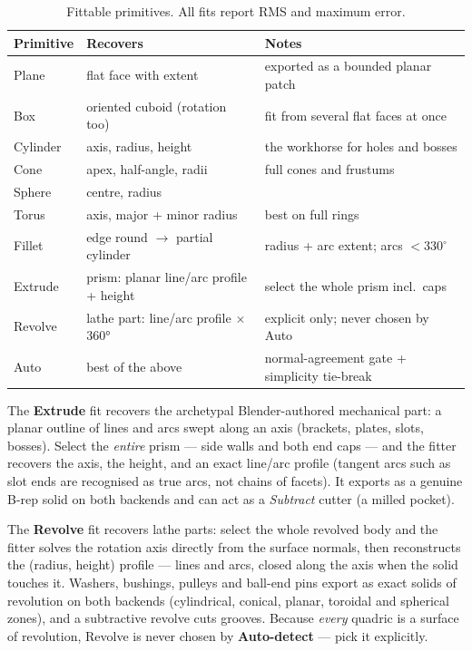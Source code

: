 \documentclass[11pt,a4paper]{article}
\newcommand{\ui}[1]{\textsf{\textbf{#1}}}   %
\begin{document}
\begin{table}[h]
\centering
\small
\begin{tabular}{@{}lll@{}}
\toprule
\textbf{Primitive} & \textbf{Recovers} & \textbf{Notes} \\
\midrule
Plane    & flat face with extent            & exported as a bounded planar patch \\
Box      & oriented cuboid (rotation too)   & fit from several flat faces at once \\
Cylinder & axis, radius, height             & the workhorse for holes and bosses \\
Cone     & apex, half-angle, radii          & full cones and frustums \\
Sphere   & centre, radius                   & \\
Torus    & axis, major + minor radius       & best on full rings \\
Fillet   & edge round $\to$ partial cylinder & radius + arc extent; arcs $<330^\circ$ \\
Extrude  & prism: planar line/arc profile + height & select the whole prism incl.\ caps \\
Revolve  & lathe part: line/arc profile $\times$ 360° & explicit only; never chosen by Auto \\
Auto     & best of the above                & normal-agreement gate + simplicity tie-break \\
\bottomrule
\end{tabular}
\caption{Fittable primitives. All fits report RMS and maximum error.}
\end{table}

The \textbf{Extrude} fit recovers the archetypal Blender-authored mechanical
part: a planar outline of lines and arcs swept along an axis (brackets,
plates, slots, bosses). Select the \emph{entire} prism — side walls and both
end caps — and the fitter recovers the axis, the height, and an exact
line/arc profile (tangent arcs such as slot ends are recognised as true
arcs, not chains of facets). It exports as a genuine B-rep solid on both
backends and can act as a \emph{Subtract} cutter (a milled pocket).

The \textbf{Revolve} fit recovers lathe parts: select the whole revolved
body and the fitter solves the rotation axis directly from the surface
normals, then reconstructs the (radius, height) profile — lines and arcs,
closed along the axis when the solid touches it. Washers, bushings, pulleys
and ball-end pins export as exact solids of revolution on both backends
(cylindrical, conical, planar, toroidal and spherical zones), and a
subtractive revolve cuts grooves. Because \emph{every} quadric is a surface
of revolution, Revolve is never chosen by \ui{Auto-detect} — pick it
explicitly.
\end{document}
